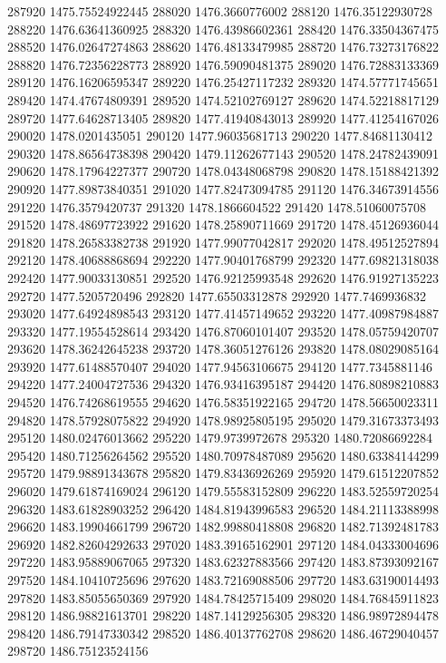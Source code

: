 {287920 1475.75524922445
288020 1476.3660776002
288120 1476.35122930728
288220 1476.63641360925
288320 1476.43986602361
288420 1476.33504367475
288520 1476.02647274863
288620 1476.48133479985
288720 1476.73273176822
288820 1476.72356228773
288920 1476.59090481375
289020 1476.72883133369
289120 1476.16206595347
289220 1476.25427117232
289320 1474.57771745651
289420 1474.47674809391
289520 1474.52102769127
289620 1474.52218817129
289720 1477.64628713405
289820 1477.41940843013
289920 1477.41254167026
290020 1478.0201435051
290120 1477.96035681713
290220 1477.84681130412
290320 1478.86564738398
290420 1479.11262677143
290520 1478.24782439091
290620 1478.17964227377
290720 1478.04348068798
290820 1478.15188421392
290920 1477.89873840351
291020 1477.82473094785
291120 1476.34673914556
291220 1476.3579420737
291320 1478.1866604522
291420 1478.51060075708
291520 1478.48697723922
291620 1478.25890711669
291720 1478.45126936044
291820 1478.26583382738
291920 1477.99077042817
292020 1478.49512527894
292120 1478.40688868694
292220 1477.90401768799
292320 1477.69821318038
292420 1477.90033130851
292520 1476.92125993548
292620 1476.91927135223
292720 1477.5205720496
292820 1477.65503312878
292920 1477.7469936832
293020 1477.64924898543
293120 1477.41457149652
293220 1477.40987984887
293320 1477.19554528614
293420 1476.87060101407
293520 1478.05759420707
293620 1478.36242645238
293720 1478.36051276126
293820 1478.08029085164
293920 1477.61488570407
294020 1477.94563106675
294120 1477.7345881146
294220 1477.24004727536
294320 1476.93416395187
294420 1476.80898210883
294520 1476.74268619555
294620 1476.58351922165
294720 1478.56650023311
294820 1478.57928075822
294920 1478.98925805195
295020 1479.31673373493
295120 1480.02476013662
295220 1479.9739972678
295320 1480.72086692284
295420 1480.71256264562
295520 1480.70978487089
295620 1480.63384144299
295720 1479.98891343678
295820 1479.83436926269
295920 1479.61512207852
296020 1479.61874169024
296120 1479.55583152809
296220 1483.52559720254
296320 1483.61828903252
296420 1484.81943996583
296520 1484.21113388998
296620 1483.19904661799
296720 1482.99880418808
296820 1482.71392481783
296920 1482.82604292633
297020 1483.39165162901
297120 1484.04333004696
297220 1483.95889067065
297320 1483.62327883566
297420 1483.87393092167
297520 1484.10410725696
297620 1483.72169088506
297720 1483.63190014493
297820 1483.85055650369
297920 1484.78425715409
298020 1484.76845911823
298120 1486.98821613701
298220 1487.14129256305
298320 1486.98972894478
298420 1486.79147330342
298520 1486.40137762708
298620 1486.46729040457
298720 1486.75123524156
}
